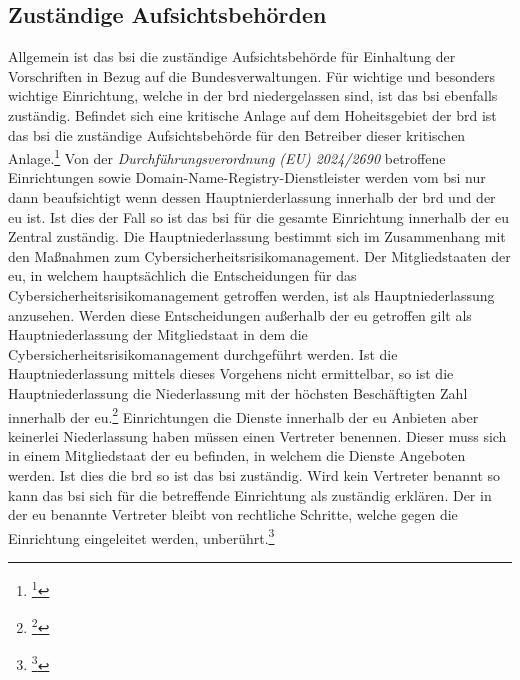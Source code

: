 \documentclass[11pt,a4paper,hidelinks]{article}   %
\begin{document}
        \subsection{Zuständige Aufsichtsbehörden}
        Allgemein ist das \gls{bsi} die zuständige Aufsichtsbehörde für Einhaltung der Vorschriften in Bezug auf die Bundesverwaltungen. Für wichtige und besonders wichtige Einrichtung, welche in der \gls{brd} niedergelassen sind, ist das \gls{bsi} ebenfalls zuständig. Befindet sich eine kritische Anlage auf dem Hoheitsgebiet der \gls{brd} ist das \gls{bsi} die zuständige Aufsichtsbehörde für den Betreiber dieser kritischen Anlage.\footnote{
            \footcite[Vgl.][, §59]{NIS2UmsuCG}
        }\medbreak
        Von der \emph{Durchführungsverordnung (EU) 2024/2690} betroffene Einrichtungen sowie Domain-Name-Registry-Dienstleister werden vom \gls{bsi} nur dann beaufsichtigt wenn dessen Hauptnierderlassung innerhalb der \gls{brd} und der \gls{eu} ist. Ist dies der Fall so ist das \gls{bsi} für die gesamte Einrichtung innerhalb der \gls{eu} Zentral zuständig. Die Hauptniederlassung bestimmt sich im Zusammenhang mit den Maßnahmen zum Cybersicherheitsrisikomanagement. Der Mitgliedstaaten der \gls{eu}, in welchem hauptsächlich die Entscheidungen für das Cybersicherheitsrisikomanagement getroffen werden, ist als Hauptniederlassung anzusehen. Werden diese Entscheidungen außerhalb der \gls{eu} getroffen gilt als Hauptniederlassung der Mitgliedstaat in dem die Cybersicherheitsrisikomanagement durchgeführt werden. Ist die Hauptniederlassung mittels dieses Vorgehens nicht ermittelbar, so ist die Hauptniederlassung die Niederlassung mit der höchsten Beschäftigten Zahl innerhalb der \gls{eu}.\footnote{
            \footcite[Vgl.][, §60, Absatz 1 \& 2]{NIS2UmsuCG}
        }
        Einrichtungen die Dienste innerhalb der \gls{eu} Anbieten aber keinerlei Niederlassung haben müssen einen Vertreter benennen. Dieser muss sich in einem Mitgliedstaat der \gls{eu} befinden, in welchem die Dienste Angeboten werden. Ist dies die \gls{brd} so ist das \gls{bsi} zuständig. Wird kein Vertreter benannt so kann das \gls{bsi} sich für die betreffende Einrichtung als zuständig erklären. Der in der \gls{eu} benannte Vertreter bleibt von rechtliche Schritte, welche gegen die Einrichtung eingeleitet werden, unberührt.\footnote{
            \footcite[Vgl.][, §60, Absatz 3 \& 4]{NIS2UmsuCG}
        }\medbreak
\end{document}
